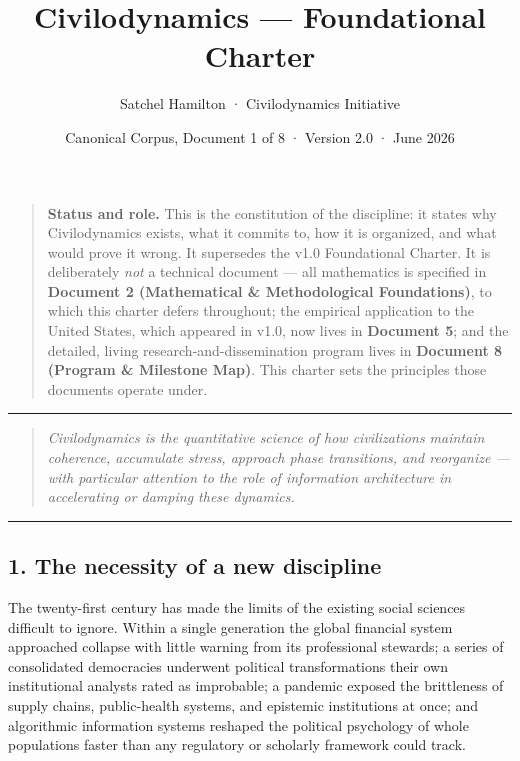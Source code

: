 \documentclass[
]{article}
\title{Civilodynamics --- Foundational Charter}
\author{Satchel Hamilton · Civilodynamics Initiative}
\date{Canonical Corpus, Document 1 of 8 · Version 2.0 · June 2026}
\begin{document}
\maketitle

\begin{quote}
\textbf{Status and role.} This is the constitution of the discipline: it
states why Civilodynamics exists, what it commits to, how it is
organized, and what would prove it wrong. It supersedes the v1.0
Foundational Charter. It is deliberately \emph{not} a technical document
--- all mathematics is specified in \textbf{Document 2 (Mathematical \&
Methodological Foundations)}, to which this charter defers throughout;
the empirical application to the United States, which appeared in v1.0,
now lives in \textbf{Document 5}; and the detailed, living
research-and-dissemination program lives in \textbf{Document 8 (Program
\& Milestone Map)}. This charter sets the principles those documents
operate under.
\end{quote}

\begin{center}\rule{0.5\linewidth}{0.5pt}\end{center}

\begin{quote}
\emph{Civilodynamics is the quantitative science of how civilizations
maintain coherence, accumulate stress, approach phase transitions, and
reorganize --- with particular attention to the role of information
architecture in accelerating or damping these dynamics.}
\end{quote}

\begin{center}\rule{0.5\linewidth}{0.5pt}\end{center}

\subsection{1. The necessity of a new
discipline}\label{the-necessity-of-a-new-discipline}

The twenty-first century has made the limits of the existing social
sciences difficult to ignore. Within a single generation the global
financial system approached collapse with little warning from its
professional stewards; a series of consolidated democracies underwent
political transformations their own institutional analysts rated as
improbable; a pandemic exposed the brittleness of supply chains,
public-health systems, and epistemic institutions at once; and
algorithmic information systems reshaped the political psychology of
whole populations faster than any regulatory or scholarly framework
could track.
\end{document}
